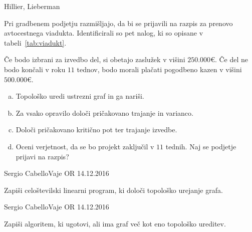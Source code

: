 \begin{naloga}{Hillier, Lieberman}{\cite[Problem~10.4-4]{hl}}
\begin{vprasanje}
Pri gradbenem podjetju razmišljajo,
da bi se prijavili na razpis za prenovo avtocestnega viadukta.
Identificirali so pet nalog, ki so opisane v tabeli~\ref{tab:viadukt}.

Če bodo izbrani za izvedbo del, si obetajo zaslužek v višini $250.000 €$.
Če del ne bodo končali v roku $11$ tednov,
bodo morali plačati pogodbeno kazen v višini $500.000 €$.
\begin{enumerate}[(a)]
\item Topološko uredi ustrezni graf in ga nariši.
\item Za vsako opravilo določi pričakovano trajanje in varianco.
\item Določi pričakovano kritično pot ter trajanje izvedbe.
\item Oceni verjetnost, da se bo projekt zaključil v $11$ tednih.
Naj se podjetje prijavi na razpis?
\end{enumerate}

\begin{table}[t]
\caption{Podatki za nalogo~\ref{nal:viadukt}.}
\label{tab:viadukt}
\end{table}
\end{vprasanje}
\begin{odgovor}
\end{odgovor}
\end{naloga}


\begin{naloga}{Sergio Cabello}{Vaje OR 14.12.2016}
\begin{vprasanje}
Zapiši celoštevilski linearni program, ki določi topološko urejanje grafa.
\end{vprasanje}
\begin{odgovor}
\end{odgovor}
\end{naloga}


\begin{naloga}{Sergio Cabello}{Vaje OR 14.12.2016}
\begin{vprasanje}
Zapiši algoritem, ki ugotovi, ali ima graf več kot eno topološko ureditev.
\end{vprasanje}
\begin{odgovor}
\end{odgovor}
\end{naloga}
